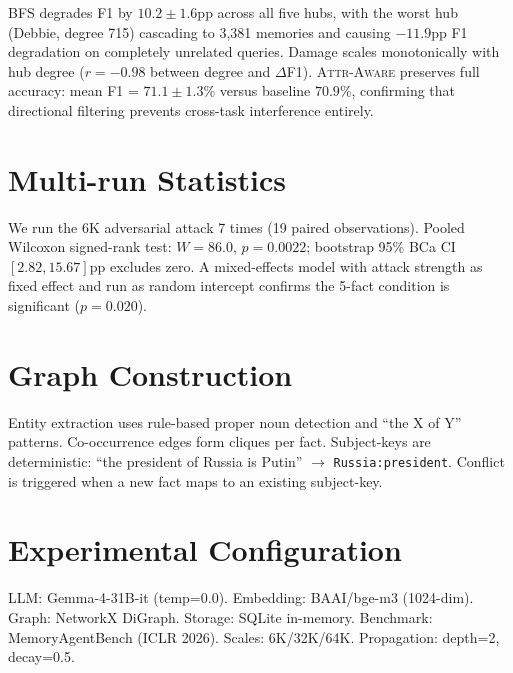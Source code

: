 \documentclass{article}
\newcommand{\attraware}{\textsc{Attr-Aware}}
\begin{document}
BFS degrades F1 by $10.2\pm1.6$pp across all five hubs, with the worst hub (Debbie, degree 715) cascading to 3,381 memories and causing $-11.9$pp F1 degradation on completely unrelated queries.
Damage scales monotonically with hub degree ($r = -0.98$ between degree and $\Delta$F1).
\attraware{} preserves full accuracy: mean F1 = $71.1\pm1.3$\% versus baseline $70.9$\%, confirming that directional filtering prevents cross-task interference entirely.

\section{Multi-run Statistics}
\label{app:stats}

We run the 6K adversarial attack 7 times (19 paired observations).
Pooled Wilcoxon signed-rank test: $W = 86.0$, $p = 0.0022$; bootstrap 95\% BCa CI $[2.82, 15.67]$pp excludes zero.
A mixed-effects model with attack strength as fixed effect and run as random intercept confirms the 5-fact condition is significant ($p = 0.020$).

\section{Graph Construction}
\label{app:graph}

Entity extraction uses rule-based proper noun detection and ``the X of Y'' patterns.
Co-occurrence edges form cliques per fact.
Subject-keys are deterministic: ``the president of Russia is Putin'' $\rightarrow$ \texttt{Russia:president}.
Conflict is triggered when a new fact maps to an existing subject-key.

\section{Experimental Configuration}
\label{app:config}

LLM: Gemma-4-31B-it (temp=0.0). Embedding: BAAI/bge-m3 (1024-dim). Graph: NetworkX DiGraph. Storage: SQLite in-memory. Benchmark: MemoryAgentBench (ICLR 2026). Scales: 6K/32K/64K. Propagation: depth=2, decay=0.5.
\end{document}
